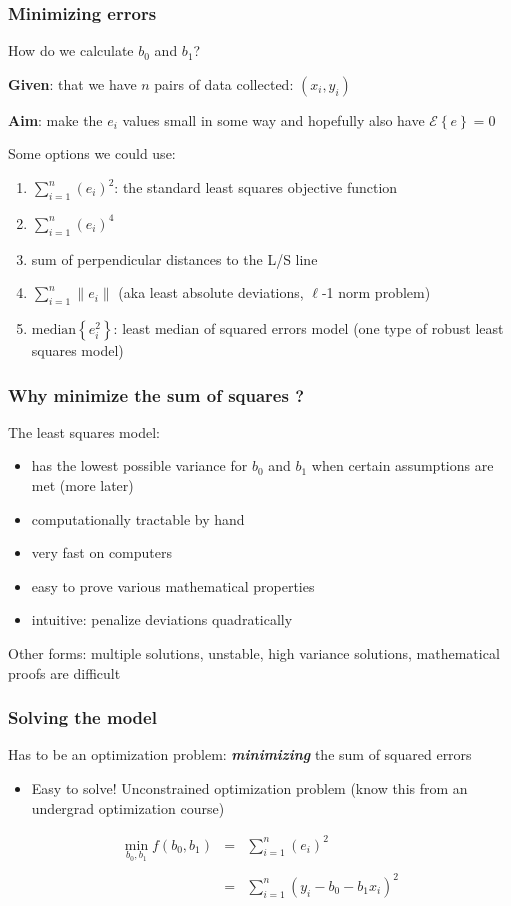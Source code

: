 \begin{frame}\frametitle{Minimizing errors}

	How do we calculate $b_0$ and $b_1$?

	\textbf{Given}: that we have $n$ pairs of data collected: $(x_i, y_i)$

	\textbf{Aim}: make the $e_i$ values small in some way and hopefully also have $\mathcal{E}\left\{e\right\} = 0$

	\vspace{24pt}
	Some options we could use:
	\begin{enumerate}
		\item	$\sum_{i=1}^{n}{(e_i)^2}$: the standard least squares objective function
		\item	$\sum_{i=1}^{n}{(e_i)^4}$
		\item	sum of perpendicular distances to the L/S line
		\item	$\sum_{i=1}^{n}{\|e_i\|}$ (aka least absolute deviations, $\ell$-1 norm problem)
		\item	$\text{median}\left\{ e_i^2 \right\}$: least median of squared errors model (one type of robust least squares model)
	\end{enumerate}
\end{frame}

\begin{frame}\frametitle{Why minimize the sum of squares ?}

	The least squares model:
	\begin{itemize}
		\item	has the lowest possible variance for $b_0$ and $b_1$ when certain assumptions are met (more later)
		\item	computationally tractable by hand
		\item	very fast on computers
		\item	easy to prove various mathematical properties
		\item	intuitive: penalize deviations quadratically
	\end{itemize}

	Other forms: multiple solutions, unstable, high variance solutions, mathematical proofs are difficult
\end{frame}

\begin{frame}\frametitle{Solving the model}

	Has to be an optimization problem: \textbf{\emph{minimizing}} the sum of squared errors
	\begin{itemize}
		\item	Easy to solve! Unconstrained optimization problem (know this from an undergrad optimization course)
	\end{itemize}

	$$
	\begin{array}{rcl}
		\min_{\displaystyle b_0, b_1} f(b_0, b_1) &=& \sum_{i=1}^{n}{(e_i)^2} \\
		\\
		&=& \sum_{i=1}^{n}{\left(y_i - b_0 - b_1 x_i\right)^2}
	\end{array}
	$$
\end{frame}

